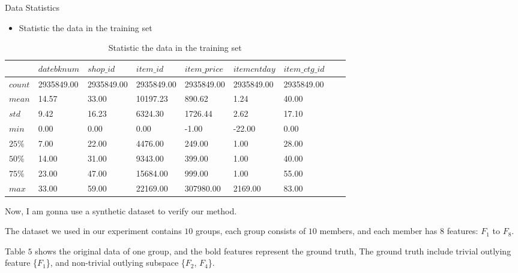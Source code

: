 \documentclass[
 size=14pt,
 paper=smartboard,  %
 mode=present, 		%
 display=slides, 	%
 style=tuliplab,  	%
 pauseslide,
 fleqn,leqno]{powerdot}
\begin{document}
\begin{slide}{Data Statistics}

  \begin{itemize}
  \item Statistic the data in the training set
  \end{itemize}
  
  \begin{table}
  \setlength{\abovecaptionskip}{0pt}
  \setlength{\belowcaptionskip}{10pt}
  \centering
  \caption{Statistic the data in the training set}
  
  \begin{tabular}{p{1.1cm}p{2.5cm}p{2.5cm}p{2.5cm}p{2.5cm}p{2.5cm}p{2.5cm}p{2.5cm}p{2.5cm}}
  \hline
      & $datebknum$ & $shop\_id$ & $item\_id$ & $item\_price$ & $item cnt day$ & $item\_ctg\_id$\\
  \hline
    $count$   & 2935849.00 & 2935849.00  & 2935849.00  & 2935849.00  & 2935849.00  & 2935849.00 \\
    $mean$   & 14.57  & 33.00  & 10197.23  & 890.62  & 1.24 & 40.00 \\
    $std$   & 9.42  & 16.23 & 6324.30  & 1726.44 & 2.62 & 17.10 \\
    $min$   & 0.00  & 0.00  & 0.00  & -1.00  & -22.00 & 0.00 \\
    $25\%$   & 7.00    & 22.00  & 4476.00  & 249.00  & 1.00 & 28.00 \\
    $50\%$   & 14.00  & 31.00 & 9343.00 & 399.00  & 1.00  & 40.00 \\
    $75\%$   & 23.00  & 47.00  & 15684.00  & 999.00  & 1.00 & 55.00 \\
    $max$   & 33.00 & 59.00  & 22169.00 & 307980.00  & 2169.00 &83.00 \\
    
  \hline
  \end{tabular}
  \end{table}
  
  \begin{note}
  Now,
  I am gonna use a synthetic dataset to verify our method.
  
  The dataset we used in our experiment contains $10$ groups,
  each group consists of $10$ members,
  and each member has $8$ features: $F_1$ to $F_8$.
  
  Table $5$ shows the original data of one group,
  and the bold features represent the ground truth,
  The ground truth include trivial outlying feature \{$F_1$\},
  and non-trivial outlying subspace \{$F_2$, $F_4$\}.
  \end{note}
  
  \end{slide}
\end{document}
